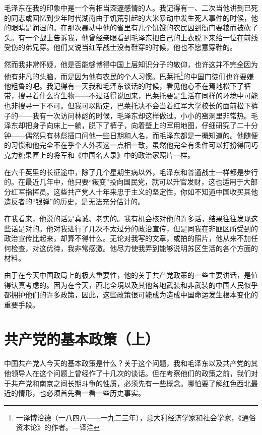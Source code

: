 \documentclass[10pt]{book}
\begin{document}
毛泽东在我的印象中是一个有相当深邃感情的人。我记得有一、二次当他讲到已死的同志或回忆到少年时代湖南由于饥荒引起的大米暴动中发生死人事件的时候，他的眼睛是润湿的。在那次暴动中他的省里有几个饥饿的农民因到衙门要粮而被砍了头。有一个战士告诉我，他曾经亲眼看到毛泽东把自己的上衣脱下来给一位在前线受伤的弟兄穿。他们又说当红军战士没有鞋穿的时候，他也不愿意穿鞋的。

然而我非常怀疑，他是否能够博得中国上层知识分子的敬仰，也许这并不完全因为他有非凡的头脑，而是因为他有农民的个人习惯。巴莱托\footnote{一译博洽德（一八四八——一九二三年），意大利经济学家和社会学家，《通俗资本论》的作者。—译注}的中国门徒们也许要嫌他粗鲁的吧。我记得有一天我和毛泽东谈话的时候，看见他心不在焉地松下了裤带，搜寻着什么寄生物——不过话得说回来，巴莱托要是生活在同样的环境中可能也非搜寻一下不可。但我可以断定，巴莱托决不会当着红军大学校长的面前松下裤子的——我有一次访问林彪的时候，毛泽东却这样做过。小小的窑洞里非常热。毛泽东却把身子向床上一躺，脱下了裤子，向着壁上的军用地图，仔细研究了二十分钟——偶然只有林彪插口问他一些日期和人名，而毛泽东都是一概知道的。他随便的习惯和他完全不在乎个人外表这一点相一致，虽然他完全有条件可以打扮得同巧克力糖果匣上的将军和《中国名人录》中的政治家照片一样。

在六千英里的长征途中，除了几个星期生病以外，毛泽东和普通战士一样都是步行的。在最近几年中，他只要“叛变”投向国民党，就可以升官发财，这也适用于大部分红军指挥员。这些共产党人十年来忠于主义的坚定性，你如不知道中国收买其他造反者的“银弹”的历史，是无法充分估计的。

在我看来，他说的话是真诚、老实的。我有机会核对他的许多话，结果往往发现这些话是对的。他对我进行了几次不太过分的政治宣传，但是同我在非匪区所受到的政治宣传比起来，却算不得什么。无论对我写的文章，或拍的照片，他从来不加任何检查，对这优待，我非常感激。他尽力使我弄到能够说明苏区生活的各个方面的材料。

由于在今天中国政局上的极大重要性，他的关于共产党政策的一些主要讲话，是值得认真考虑的。因为在今天，西北全境以及其他各地武装和非武装的中国人民似乎都拥护他们的许多政策，因此，这些政策很可能成为造成中国命运发生根本变化的重要手段。



\section{共产党的基本政策（上）}

中国共产党人今天的基本政策是什么？关于这个问题，我和毛泽东以及共产党的其他领导人在这个问题上曾经作了十几次的谈话。但在考察他们的政策之前，我们对于共产党和南京之间长期斗争的性质，必须先有一些概念。哪怕要了解红色西北最近的情形，也必须首先看一看一些历史事实。
\end{document}
